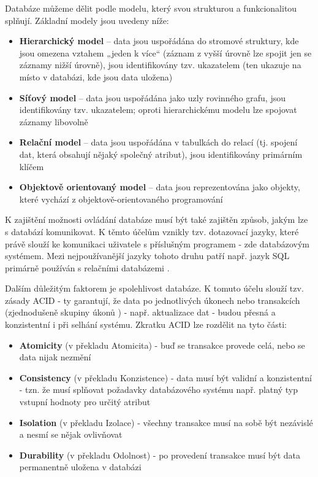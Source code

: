 	Databáze můžeme dělit podle modelu, který svou strukturou a funkcionalitou splňují. Základní modely jsou uvedeny níže: \cite{DBModel}
		
	\begin{itemize}
		\item \textbf{Hierarchický model} – data jsou uspořádána do stromové struktury, kde jsou omezena vztahem „jeden k více“ (záznam z vyšší úrovně lze spojit jen se záznamy nižší úrovně), jsou identifikovány tzv. ukazatelem (ten ukazuje na místo v databázi, kde jsou data uložena) \cite{HierarchDB}
		\item \textbf{Síťový model} – data jsou uspořádána jako uzly rovinného grafu, jsou identifikovány tzv. ukazatelem; oproti hierarchickému modelu lze spojovat záznamy libovolně \cite{SitDB} 
		\item \textbf{Relační model} – data jsou uspořádána v tabulkách do relací (tj. spojení dat, která obsahují nějaký společný atribut), jsou identifikovány primárním klíčem \cite{RelacDB}
		\item \textbf{Objektově orientovaný model} – data jsou reprezentována jako objekty, které vychází z objektově-orientovaného programování \cite{OOPDB}
	\end{itemize}
	
	K zajištění možnosti ovládání databáze musí být také zajištěn způsob, jakým lze s databází komunikovat. K těmto účelům vznikly tzv. dotazovací jazyky, které právě slouží ke komunikaci uživatele s příslušným programem \cite{DotazJazyk} - zde databázovým systémem. Mezi nejpoužívanější jazyky tohoto druhu patří např. jazyk SQL primárně používán s relačními databázemi \cite{SQL}.
	
	Dalším důležitým faktorem je spolehlivost databáze. K tomuto účelu slouží tzv. zásady ACID - ty garantují, že data po jednotlivých úkonech nebo transakcích (zjednodušeně skupiny úkonů \cite{Transakce}) - např. aktualizace dat - budou přesná a konzistentní i při selhání systému. Zkratku ACID lze rozdělit na tyto části:
	
	\begin{itemize}
		\item \textbf{Atomicity} (v překladu Atomicita) - buď se transakce provede celá, nebo se data nijak nezmění
		\item \textbf{Consistency} (v překladu Konzistence) - data musí být validní a konzistentní - tzn. že musí splňovat požadavky databázového systému např. platný typ vstupní hodnoty pro určitý atribut
		\item \textbf{Isolation} (v překladu Izolace) - všechny transakce musí na sobě být nezávislé a nesmí se nějak ovlivňovat
		\item \textbf{Durability} (v překladu Odolnost) - po provedení transakce musí být data permanentně uložena v databázi
		\cite{ACID}
	\end{itemize}
	

